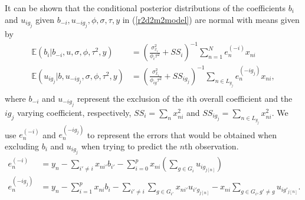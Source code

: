 It can be shown that the conditional posterior distributions of the coefficients $b_i$ and $u_{ig_j}$ given $b_{-i}, u_{-ig_j}, \phi, \sigma, \tau, y$ in (\ref{r2d2m2model}) are normal with means given by
\begin{equation}
\label{postbmeancond}
    \begin{aligned}
     \mathbb{E}(b_i|  b_{-i}, u,\sigma, \phi, \tau^2, y )&= \left( \frac{\sigma^2_{x_i}}{\phi_i
    \tau^2}+ SS_i  \right)^{-1}  \sum_{n=1}^N e_{n}^{(-i)} x_{ni}     \\
    \mathbb{E}(u_{ig_j}| b, u_{-ig_j} ,\sigma, \phi, \tau^2, y )&= \left(  \frac{\sigma^2_{x_i}}{\phi_{ig}\tau^2} + SS_{ig_j}  \right)^{-1} \sum_{n \in L_{g_j}}  e_{n}^{(-ig_j)} x_{ni}, \\
    \end{aligned}
\end{equation}
where $b_{-i}$ and $u_{-ig_j}$ represent the exclusion of the $i$th overall coefficient and the $ig_j$ varying coefficient, respectively, $SS_i=\sum_{n} x^2_{ni}$ and $SS_{ig_j}=\sum_{n \in L_{g_j}} x_{ni}^2$. We use $e_{n}^{(-i)}$ and $e_{n}^{(-ig_j)}$ to represent the errors that would be obtained when excluding $b_{i}$ and $u_{ig_j}$ when trying to predict the $n$th observation.
\begin{align*}
e_{n}^{(-i)} &=  y_n    -\sum_{i'\neq i} x_{ni'} b_{i'} -\sum_{i=0}^p  x_{ni} \left( \sum_{g \in G_i} u_{i g_{j[n]}} \right)   \\
e_{n}^{(-ig_j)}&=  y_n - \sum_{i=1}^p x_{ni} b_i - \sum_{i'\neq i}\sum_{g \in G_{i'}} x_{ni'} u_{i'g_{j[n]}}- x_{ni} \sum_{g \in G_i, g'\neq g} u_{ig'_{j[n]}}.
\end{align*}

